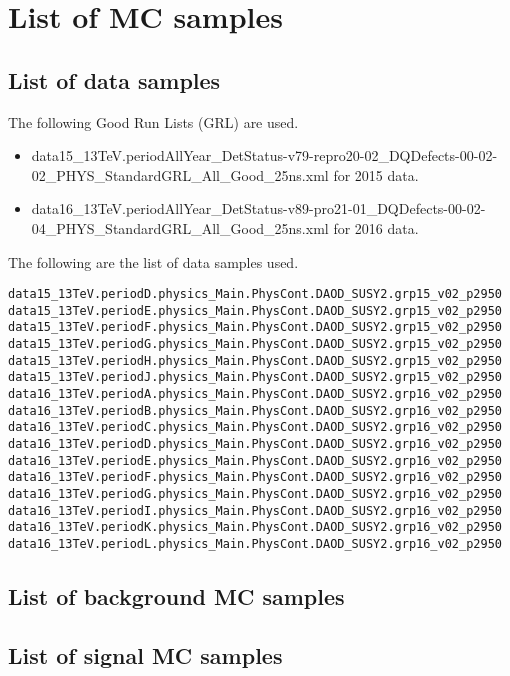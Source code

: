 \chapter{List of MC samples}
\label{ch:appendixOne}

\section{List of data samples}
\label{sec:List_Data}
The following Good Run Lists (GRL) are used.
\begin{itemize}
\item {\ttfamily\scriptsize data15\_13TeV.periodAllYear\_DetStatus-v79-repro20-02\_DQDefects-00-02-02\_PHYS\_StandardGRL\_All\_Good\_25ns.xml} for 2015 data.
\item {\ttfamily\scriptsize data16\_13TeV.periodAllYear\_DetStatus-v89-pro21-01\_DQDefects-00-02-04\_PHYS\_StandardGRL\_All\_Good\_25ns.xml} for 2016 data.
\end{itemize}
The following are the list of data samples used.
\scriptsize
\begin{verbatim}
data15_13TeV.periodD.physics_Main.PhysCont.DAOD_SUSY2.grp15_v02_p2950
data15_13TeV.periodE.physics_Main.PhysCont.DAOD_SUSY2.grp15_v02_p2950
data15_13TeV.periodF.physics_Main.PhysCont.DAOD_SUSY2.grp15_v02_p2950
data15_13TeV.periodG.physics_Main.PhysCont.DAOD_SUSY2.grp15_v02_p2950
data15_13TeV.periodH.physics_Main.PhysCont.DAOD_SUSY2.grp15_v02_p2950
data15_13TeV.periodJ.physics_Main.PhysCont.DAOD_SUSY2.grp15_v02_p2950
data16_13TeV.periodA.physics_Main.PhysCont.DAOD_SUSY2.grp16_v02_p2950
data16_13TeV.periodB.physics_Main.PhysCont.DAOD_SUSY2.grp16_v02_p2950
data16_13TeV.periodC.physics_Main.PhysCont.DAOD_SUSY2.grp16_v02_p2950
data16_13TeV.periodD.physics_Main.PhysCont.DAOD_SUSY2.grp16_v02_p2950
data16_13TeV.periodE.physics_Main.PhysCont.DAOD_SUSY2.grp16_v02_p2950
data16_13TeV.periodF.physics_Main.PhysCont.DAOD_SUSY2.grp16_v02_p2950
data16_13TeV.periodG.physics_Main.PhysCont.DAOD_SUSY2.grp16_v02_p2950
data16_13TeV.periodI.physics_Main.PhysCont.DAOD_SUSY2.grp16_v02_p2950
data16_13TeV.periodK.physics_Main.PhysCont.DAOD_SUSY2.grp16_v02_p2950
data16_13TeV.periodL.physics_Main.PhysCont.DAOD_SUSY2.grp16_v02_p2950
\end{verbatim}
\normalsize

\section{List of background MC samples}
\label{sec:MCBG}












\clearpage
\section{List of signal MC samples}
\label{sec:MCSig}

